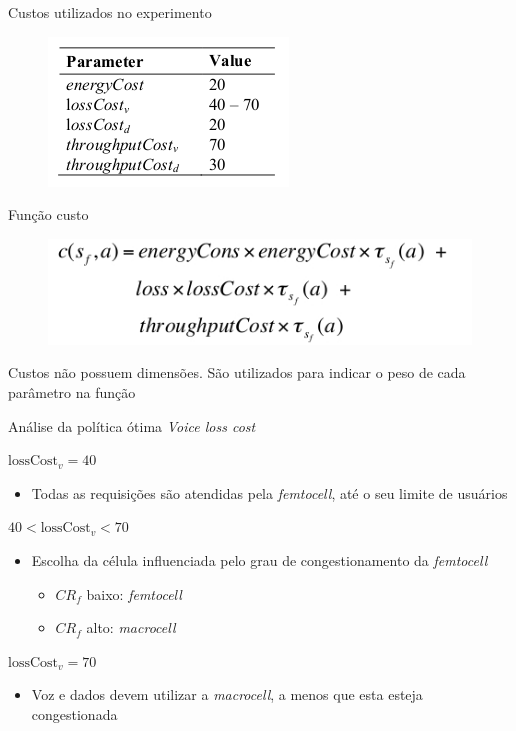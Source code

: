 \begin{frame}
  \begin{block}{Custos utilizados no experimento}
    \begin{figure}
      \includegraphics[scale=0.47]{./Figures/costsTable}
    \end{figure}
  \end{block}
  \begin{block}{Função custo}
    \begin{figure}
      \includegraphics[scale=0.37]{./Figures/form4}
    \end{figure}
  \end{block}
  Custos não possuem dimensões. São utilizados para indicar o peso de cada
  parâmetro na função
\end{frame}

\begin{frame}{Análise da política ótima}
  \textit{Voice loss cost}
  \begin{block}{$ \text{lossCost}_v = 40$}
    \begin{itemize}
      \item Todas as requisições são atendidas pela \textit{femtocell}, até o
      seu limite de usuários
    \end{itemize}
  \end{block}
  \begin{block}{$40 < \text{lossCost}_v < 70$}
    \begin{itemize}
      \item Escolha da célula influenciada pelo grau de congestionamento da
      \textit{femtocell}
      \begin{itemize}
        \item $CR_f$ baixo: \textit{femtocell}
        \item $CR_f$ alto: \textit{macrocell}
      \end{itemize}
    \end{itemize}
  \end{block}
  \begin{block}{$\text{lossCost}_v = 70$}
    \begin{itemize}
      \item Voz e dados devem utilizar a \textit{macrocell}, a menos que esta
      esteja congestionada
    \end{itemize}
  \end{block}
\end{frame}

